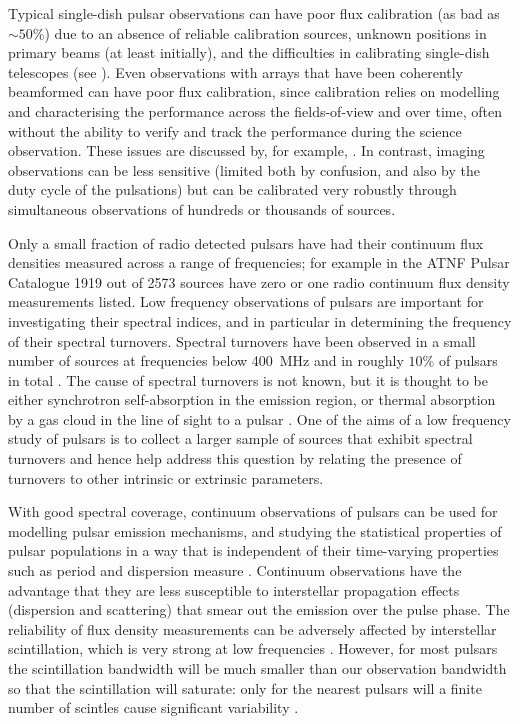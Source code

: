 \documentclass{pasa}%
\newcommand{\changed}[1]{{#1}}
\begin{document}
\changed{Typical single-dish pulsar observations can have poor flux calibration (as bad as $\sim 50$\%) due to an absence of reliable calibration sources, unknown positions in primary beams (at least initially)}, and the difficulties in calibrating single-dish telescopes (see \citealt{oneil02,lorimer12}). Even observations with arrays that have been coherently beamformed can have poor flux calibration, since calibration relies on modelling and characterising the performance across the fields-of-view and over time, often without the ability to verify and track the performance during the science observation. \changed{These issues are discussed by, for example, \citet{bilous16}.} In contrast, imaging observations can be less sensitive \changed{(limited both by confusion, and also by
the duty cycle of the pulsations)} but can be calibrated very robustly through simultaneous observations of hundreds or thousands of sources. 

\changed{Only a small fraction of radio detected pulsars have had their continuum flux densities measured across a range of frequencies; for example in the ATNF Pulsar Catalogue 1919 out of 2573 sources have zero or one radio continuum flux density measurements listed.}
Low frequency observations of pulsars are important for investigating their
spectral indices, and in particular in determining the frequency of their spectral turnovers. Spectral turnovers have been observed in a small number of sources at frequencies below 400~MHz \citep[e.g.][]{sieber73,ellingson13} and in roughly $10\%$ of pulsars in total \citep{maron00}. The cause of spectral turnovers is not known, but it is thought to be either
synchrotron self-absorption in the emission region, or thermal absorption by a gas cloud in the line of sight to a pulsar \citep{sieber73}. One of the aims of a low frequency study of pulsars is to collect a larger sample of sources that exhibit spectral turnovers and hence help address this question by relating the presence of turnovers to other intrinsic or extrinsic parameters.

With good spectral coverage, continuum observations of pulsars can be used for modelling pulsar emission mechanisms, and studying the statistical properties of pulsar populations in a way that is independent of their time-varying properties such as period and dispersion measure \citep{lorimer95}. Continuum observations have the advantage that they are less susceptible to interstellar propagation effects (dispersion and scattering) that smear out the emission over the pulse
phase.   The reliability of  flux density measurements can be adversely affected by interstellar scintillation, which is very strong at low frequencies \citep{rickett77,bhat14}.  However, for most pulsars the scintillation bandwidth will be much smaller than our observation bandwidth so that the scintillation will saturate: only for the nearest pulsars will a finite number of scintles cause significant variability \citep{bell16}.
\end{document}
